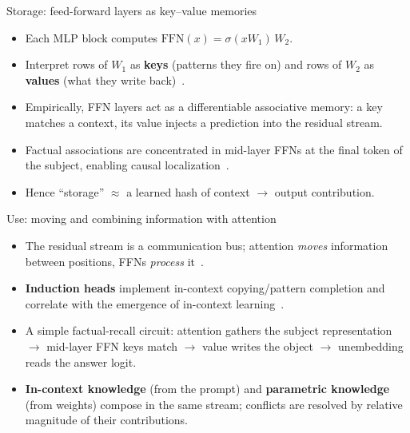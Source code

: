 \documentclass[aspectratio=169,11pt]{beamer}
\begin{document}
\begin{frame}{Storage: feed-forward layers as key--value memories}
  \begin{itemize}
    \item Each MLP block computes $\text{FFN}(x)=\sigma(x W_1)\,W_2$.
    \item Interpret rows of $W_1$ as \textbf{keys} (patterns they fire on) and rows of
      $W_2$ as \textbf{values} (what they write back)~\cite{geva2021kvmemories}.
    \item Empirically, FFN layers act as a differentiable associative memory: a key
      matches a context, its value injects a prediction into the residual stream.
    \item Factual associations are concentrated in mid-layer FFNs at the final token of
      the subject, enabling causal localization~\cite{meng2022rome}.
    \item Hence ``storage'' $\approx$ a learned hash of context $\to$ output contribution.
  \end{itemize}
\end{frame}

\begin{frame}{Use: moving and combining information with attention}
  \begin{itemize}
    \item The residual stream is a communication bus; attention \emph{moves} information
      between positions, FFNs \emph{process} it~\cite{elhage2021mathematical}.
    \item \textbf{Induction heads} implement in-context copying/pattern completion and
      correlate with the emergence of in-context learning~\cite{olsson2022incontext}.
    \item A simple factual-recall circuit: attention gathers the subject representation
      $\to$ mid-layer FFN keys match $\to$ value writes the object $\to$ unembedding reads
      the answer logit.
    \item \textbf{In-context knowledge} (from the prompt) and \textbf{parametric knowledge}
      (from weights) compose in the same stream; conflicts are resolved by relative
      magnitude of their contributions.
  \end{itemize}
\end{frame}
\end{document}
